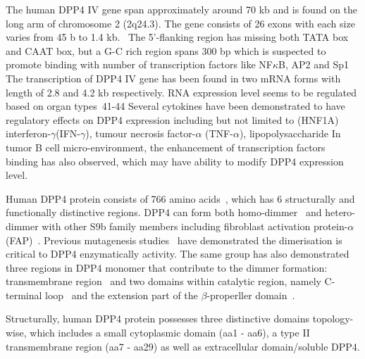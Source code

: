The human DPP4 IV gene span approximately around 70 kb and is found on the long arm of chromosome 2 (2q24.3). The gene consists of 26 exons with each size varies from 45 b to 1.4 kb.~\cite{Abbott1994} The 5'-flanking region has missing both TATA box and CAAT box, but a G-C rich region spans 300 bp which is suspected to promote binding with number of transcription factors like NF$\kappa$B, AP2 and Sp1~\cite{Abbott1994,Böhm1995} The transcription of DPP4 IV gene has been found in two mRNA forms with length of 2.8 and 4.2 kb respectively. RNA expression level seems to be regulated based on organ types~41-44
Several cytokines have been demonstrated to have regulatory effects on DPP4 expression including but not limited to (HNF1A) interferon-$\gamma$(IFN-$\gamma$), tumour necrosis factor-$\alpha$ (TNF-$\alpha$), lipopolysaccharide \cite{Erickson1999}
In tumor B cell micro-environment, the enhancement of transcription factors binding has also observed, which may have ability to modify DPP4 expression level.~\cite{Bauvois2000}
\par
Human DPP4 protein consists of 766 amino acids~\cite{Bär2003,Misumi1992}, which has 6 structurally and functionally distinctive regions. DPP4 can form both homo-dimmer~\cite{Rasmussen2003,Oefner2003,Thoma2003} and hetero-dimmer with other S9b family members including fibroblast activation protein-$\alpha$ (FAP)~\cite{Ghersi2006}. Previous mutagenesis studies~\cite{Chien_2004,Chien_2006} have demonstrated the dimerisation is critical to DPP4 enzymatically activity. The same group has also demonstrated three regions in DPP4 monomer that contribute to the dimmer formation: transmembrane region~\cite{Chung_2010} and two domains within catalytic region, namely C-terminal loop~\cite{Chien_2004} and the extension part of the $\beta$-properller domain~\cite{Chien_2006}.  
\par 
Structurally, human DPP4 protein possesses three distinctive domains topology-wise, which includes a small cytoplasmic domain (aa1 - aa6), a type II transmembrane region (aa7 - aa29) as well as extracellular domain/soluble DPP4. 
\par